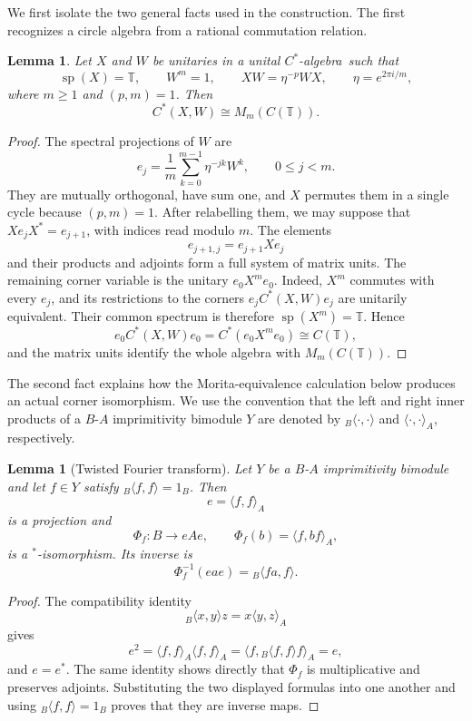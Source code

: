 \documentclass{book}
\newtheorem{lemma}[definition]{Lemma}
\def\cstar{\(C^*\)-algebra}
\begin{document}
We first isolate the two general facts used in the construction. The first
recognizes a circle algebra from a rational commutation relation.

\begin{lemma}\label{lemma:CircleAlgebraRecognition}
  Let \(X\) and \(W\) be unitaries in a unital \cstar\ such that
  \[
    \operatorname{sp}(X)=\mathbb T,
    \qquad W^m=1,
    \qquad XW=\eta^{-p}WX,
    \qquad \eta=e^{2\pi i/m},
  \]
  where \(m\geq1\) and \((p,m)=1\). Then
  \[
    C^*(X,W)\cong M_m(C(\mathbb T)).
  \]
\end{lemma}

\begin{proof}
  The spectral projections of \(W\) are
  \[
    e_j=\frac1m\sum_{k=0}^{m-1}\eta^{-jk}W^k,
    \qquad 0\leq j<m.
  \]
  They are mutually orthogonal, have sum one, and \(X\) permutes them in a
  single cycle because \((p,m)=1\). After relabelling them, we may suppose
  that \(Xe_jX^*=e_{j+1}\), with indices read modulo \(m\). The elements
  \[
    e_{j+1,j}=e_{j+1}Xe_j
  \]
  and their products and adjoints form a full system of matrix units. The
  remaining corner variable is the unitary \(e_0X^me_0\). Indeed, \(X^m\)
  commutes with every \(e_j\), and its restrictions to the corners
  \(e_jC^*(X,W)e_j\) are unitarily equivalent. Their common spectrum is
  therefore \(\operatorname{sp}(X^m)=\mathbb T\). Hence
  \[
    e_0C^*(X,W)e_0=C^*(e_0X^me_0)\cong C(\mathbb T),
  \]
  and the matrix units identify the whole algebra with
  \(M_m(C(\mathbb T))\).
\end{proof}

The second fact explains how the Morita-equivalence calculation below
produces an actual corner isomorphism. We use the convention that the left
and right inner products of a \(B\)-\(A\) imprimitivity bimodule \(Y\) are
denoted by \({}_B\langle\cdot,\cdot\rangle\) and
\(\langle\cdot,\cdot\rangle_A\), respectively.

\begin{lemma}[Twisted Fourier transform]\label{lemma:TwistedFourierCorner}
  Let \(Y\) be a \(B\)-\(A\) imprimitivity bimodule and let \(f\in Y\)
  satisfy \({}_B\langle f,f\rangle=1_B\). Then
  \[
    e=\langle f,f\rangle_A
  \]
  is a projection and
  \[
    \Phi_f\colon B\longrightarrow eAe,
    \qquad
    \Phi_f(b)=\langle f,bf\rangle_A,
  \]
  is a \(^*\)-isomorphism. Its inverse is
  \[
    \Phi_f^{-1}(eae)={}_B\langle fa,f\rangle.
  \]
\end{lemma}

\begin{proof}
  The compatibility identity
  \[
    {}_B\langle x,y\rangle z=x\langle y,z\rangle_A
  \]
  gives
  \[
    e^2
      =\langle f,f\rangle_A\langle f,f\rangle_A
      =\langle f,{}_B\langle f,f\rangle f\rangle_A=e,
  \]
  and \(e=e^*\). The same identity shows directly that \(\Phi_f\) is
  multiplicative and preserves adjoints. Substituting the two displayed
  formulas into one another and using
  \({}_B\langle f,f\rangle=1_B\) proves that they are inverse maps.
\end{proof}
\end{document}
